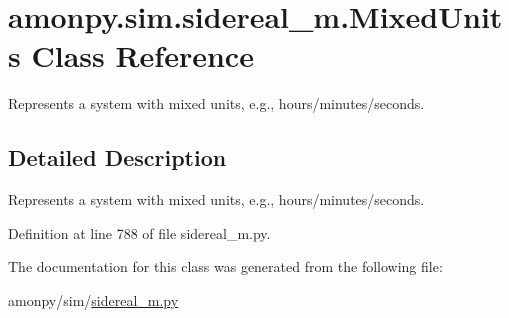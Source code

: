 \hypertarget{classamonpy_1_1sim_1_1sidereal__m_1_1_mixed_units}{\section{amonpy.\-sim.\-sidereal\-\_\-m.\-Mixed\-Units Class Reference}
\label{classamonpy_1_1sim_1_1sidereal__m_1_1_mixed_units}
}


Represents a system with mixed units, e.\-g., hours/minutes/seconds.  




\subsection{Detailed Description}
Represents a system with mixed units, e.\-g., hours/minutes/seconds. 

Definition at line 788 of file sidereal\-\_\-m.\-py.



The documentation for this class was generated from the following file\-:\begin{DoxyCompactItemize}
\item 
amonpy/sim/\hyperlink{sidereal__m_8py}{sidereal\-\_\-m.\-py}\end{DoxyCompactItemize}
